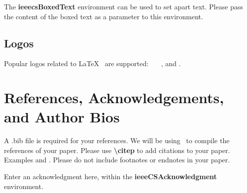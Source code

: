 \documentclass[hasAbstract,authorBox]{csmagazine}
\begin{document}
\begin{ieeecsBoxedText}{The \textbf{ieeecsBoxedText} environment can be used to set apart text. Please pass the content of the boxed text as a parameter to this environment.}
\end{ieeecsBoxedText}


\subsection{Logos}

Popular logos related to \LaTeX~ are supported: \AllTeX\ \BibLaTeX\ \XeLaTeX\ , and .


\section{References, Acknowledgements, and Author Bios}

A .bib file is required for your references. We will be using \BibTeX\ to compile the references of your paper. Please use \textbf{\textbackslash{}citep{}} to add citations to your paper. Examples \citep{Lamport1994a} and \citep{Goossens1997}. Please do not include footnotes or endnotes in your paper. \citep{Lamport1994a, Goossens1997}




\begin{ieeecsAcknowledgment}
Enter an acknowledgment here, within the \textbf{ieeeCSAcknowledgment} environment.
\end{ieeecsAcknowledgment}	

\newpage

\end{document}
